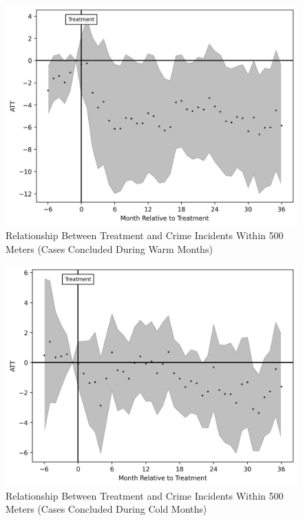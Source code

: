\documentclass[12pt]{article}
\begin{document}
    \begin{figure}[H]
        \centering
        \includegraphics{output/group_0_crimes_warm_500m/figures/att_gt_dr_event_study_long_horizon.png}
        \caption{Relationship Between Treatment and Crime Incidents Within 500 Meters (Cases Concluded During Warm Months)}
        \label{fig:my_label}
    \end{figure}

       \begin{figure}[H]
        \centering
        \includegraphics{output/group_0_crimes_cold_500m/figures/att_gt_dr_event_study_long_horizon.png}
        \caption{Relationship Between Treatment and Crime Incidents Within 500 Meters (Cases Concluded During Cold Months)}
        \label{fig:my_label}
    \end{figure}
\end{document}
